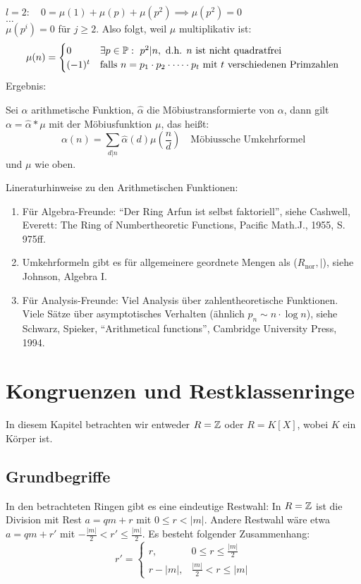 \documentclass[a4paper,twoside,DIV15,BCOR12mm]{scrbook}
\begin{document}
$l=2:\quad 0=\mu(1)+\mu(p)+\mu(p^2) \implies \mu(p^2)=0$\\
$\dotsc$\\
$\mu(p^i)=0$ für $j\geq 2$. Also folgt, weil $\mu$ multiplikativ
ist:
$$ \mu(n)=\begin{cases}0 & \exists p\in\mathbb{P}:\ p^2|n, \text{ d.h. $n$
ist nicht quadratfrei}\\(-1)^t & \text{falls $n=p_1\cdot p_2\cdot
\dotsb \cdot p_t$ mit $t$ verschiedenen Primzahlen}
\end{cases}$$
Ergebnis:
\begin{satz}
    Sei $\alpha$ arithmetische Funktion, $\hat{\alpha}$ die
    Möbiustransformierte von $\alpha$, dann gilt $\alpha=\hat{\alpha}*\mu$ mit
    der Möbiusfunktion $\mu$, das heißt:
    $$\alpha(n)=\sum_{d|n}\hat\alpha(d)\mu\left(\frac{n}{d}\right)\quad
    \text{Möbiussche Umkehrformel}$$ und $\mu$ wie oben.
\end{satz}


Lineraturhinweise zu den Arithmetischen Funktionen:
\begin{enumerate}
\item Für Algebra-Freunde: "`Der Ring Arfun ist selbst faktoriell"', siehe Cashwell, Everett: The Ring of Numbertheoretic Functions, Pacific Math.J., 1955, S. 975ff.
\item Umkehrformeln gibt es für allgemeinere geordnete Mengen als ($R_\text{nor}, |$), siehe Johnson, Algebra I.
\item Für Analysis-Freunde: Viel Analysis über zahlentheoretische Funktionen. Viele Sätze über asymptotisches Verhalten (ähnlich $p_n \sim n\cdot\log n$), siehe Schwarz, Spieker, "`Arithmetical functions"', Cambridge University Press, 1994.
\end{enumerate}

\chapter{Kongruenzen und Restklassenringe}

In diesem Kapitel betrachten wir entweder $R=\mathbb{Z}$ oder $R=K[X]$,
wobei $K$ ein Körper ist.

\section*{Grundbegriffe}

In den betrachteten Ringen gibt es eine eindeutige Restwahl: In
$R=\mathbb{Z}$ ist die Division mit Rest $a=qm+r$ mit $0\le r < |m|$.
Andere Restwahl wäre etwa $a=qm+r'$ mit $-\frac {|m|}2 < r' \le
\frac{|m|}2$. Es besteht folgender Zusammenhang:
$$r' = \begin{cases} r, & 0\le r\le \frac{|m|}{2} \\ r-|m|,& \frac{|m|}2 <
r \le |m|\end{cases}$$ %
\end{document}
